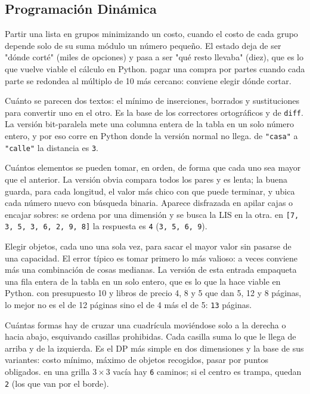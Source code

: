 \subsection*{Programación Dinámica}

Partir una lista en grupos minimizando un costo, cuando el costo de cada grupo
depende solo de su suma módulo un número pequeño. El estado deja de ser "dónde
corté" (miles de opciones) y pasa a ser "qué resto llevaba" (diez), que es lo que
vuelve viable el cálculo en Python.
\ej pagar una compra por partes cuando cada parte se redondea al múltiplo de 10 más
cercano: conviene elegir dónde cortar.

Cuánto se parecen dos textos: el mínimo de inserciones, borrados y sustituciones
para convertir uno en el otro. Es la base de los correctores ortográficos y de
\texttt{diff}. La versión bit-paralela mete una columna entera de la tabla en un
solo número entero, y por eso corre en Python donde la versión normal no llega.
\ej de \texttt{"casa"} a \texttt{"calle"} la distancia es \texttt{3}.

Cuántos elementos se pueden tomar, en orden, de forma que cada uno sea mayor que el
anterior. La versión obvia compara todos los pares y es lenta; la buena guarda, para
cada longitud, el valor más chico con que puede terminar, y ubica cada número nuevo
con búsqueda binaria. Aparece disfrazada en apilar cajas o encajar sobres: se ordena
por una dimensión y se busca la LIS en la otra.
\ej en \texttt{[7, 3, 5, 3, 6, 2, 9, 8]} la respuesta es \texttt{4}
(\texttt{3, 5, 6, 9}).

Elegir objetos, cada uno una sola vez, para sacar el mayor valor sin pasarse de una
capacidad. El error típico es tomar primero lo más valioso: a veces conviene más
una combinación de cosas medianas. La versión de esta entrada empaqueta una fila
entera de la tabla en un solo entero, que es lo que la hace viable en Python.
\ej con presupuesto 10 y libros de precio 4, 8 y 5 que dan 5, 12 y 8 páginas, lo
mejor no es el de 12 páginas sino el de 4 más el de 5: \texttt{13} páginas.

Cuántas formas hay de cruzar una cuadrícula moviéndose solo a la derecha o hacia
abajo, esquivando casillas prohibidas. Cada casilla suma lo que le llega de arriba
y de la izquierda. Es el DP más simple en dos dimensiones y la base de sus
variantes: costo mínimo, máximo de objetos recogidos, pasar por puntos obligados.
\ej en una grilla $3\times3$ vacía hay \texttt{6} caminos; si el centro es trampa,
quedan \texttt{2} (los que van por el borde).

